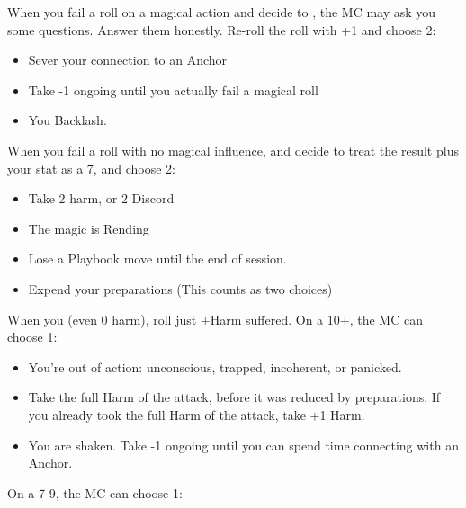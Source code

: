 



\begin{multicols}{3}
  \begin{move}
    When you fail a roll on a magical action and decide to , the MC may ask you some questions. Answer them honestly. Re-roll the roll with +1 and choose 2:

    \begin{itemize}
      \setlength\itemsep{0em}
    \item Sever your connection to an Anchor
    \item Take -1 ongoing until you actually fail a magical roll
    \item You Backlash.
    \end{itemize}

  \end{move}

  \SEPARATOR
  
  \begin{move}
    When you fail a roll with no magical influence, and decide to  treat the result plus your stat as a 7, and choose 2:

    \begin{itemize}
      \setlength\itemsep{0em}
    \item Take 2 harm, or 2 Discord
    \item The magic is Rending
    \item Lose a Playbook move until the end of session.
    \item Expend your preparations (This counts as two choices)
    \end{itemize}

  \end{move}

  \SEPARATOR

  \begin{move}
    When you  (even 0 harm), roll just +Harm suffered. On a 10+, the MC can choose 1:

    \begin{itemize}
      \setlength\itemsep{0em}
    \item You’re out of action: unconscious, trapped, incoherent, or panicked.
    \item Take the full Harm of the attack, before it was reduced by preparations. If you already took the full Harm of the attack, take +1 Harm.
    \item You are shaken. Take -1 ongoing until you can spend time connecting with an Anchor. 
    \end{itemize}
On a 7-9, the MC can choose 1:


\end{move}
\end{multicols}

